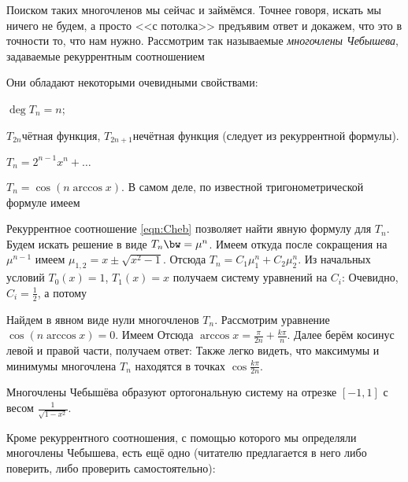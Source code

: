 \documentclass[a4paper]{article}
\begin{document}
Поиском таких многочленов мы сейчас и займёмся. Точнее говоря, искать мы ничего не будем, а просто
<<с потолка>> предъявим ответ и докажем, что это в точности то, что нам нужно. Рассмотрим так называемые
\emph{многочлены Чебышева}, задаваемые рекуррентным соотношением

Они обладают некоторыми очевидными свойствами:

\begin{nums}{-1}
\item $\deg T_n = n$;
\item $T_{2n}$\т чётная функция, $T_{2n+1}$\т нечётная функция (следует из рекуррентной формулы).
\item $T_n = 2^{n-1}x^n + \dots$
\item $T_n = \cos(n\arccos x)$. В самом деле, по известной тригонометрической формуле имеем
\end{nums}

Рекуррентное соотношение \eqref{eqn:Cheb} позволяет найти явную формулу для $T_n$. Будем искать решение в виде
$T_n \bw= \mu^n$. Имеем
откуда после сокращения на $\mu^{n-1}$ имеем
$\mu_{1,2} = x\pm \sqrt{x^2-1}$. Отсюда $T_n = C_1 \mu_1^n + C_2 \mu_2^n$.
Из начальных условий $T_0(x)=1$, $T_1(x)=x$ получаем систему уравнений на $C_i$:
Очевидно, $C_i = \frac12$, а потому

Найдем в явном виде нули многочленов $T_n$. Рассмотрим уравнение $\cos(n\arccos x)=0$. Имеем
Отсюда $\arccos x = \frac{\pi}{2n} + \frac{k\pi}{n}$. Далее берём косинус левой и правой части, получаем ответ:
Также легко видеть, что максимумы и минимумы многочлена $T_n$ находятся в точках $\cos\frac{k\pi}{2n}$.

\begin{note}
Многочлены Чебышёва образуют ортогональную систему на отрезке $[-1,1]$ с весом $\frac{1}{\sqrt{1-x^2}}$.
\end{note}

Кроме рекуррентного  соотношения, с помощью которого мы определяли многочлены Чебышева, есть ещё одно
(читателю предлагается в него либо поверить, либо проверить самостоятельно):
\end{document}
